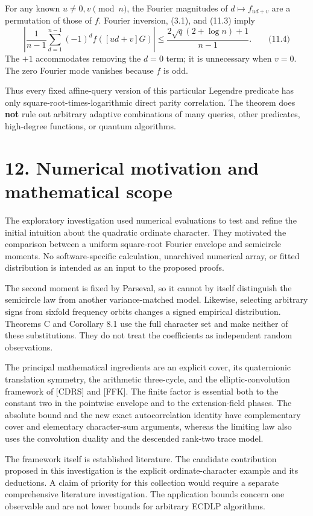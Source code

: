 \documentclass[
  11pt,
  a4paper,
]{article}
\begin{document}
For any known \(u\ne0,v\pmod n\), the Fourier magnitudes of
\(d\mapsto f_{ud+v}\) are a permutation of those of \(f\). Fourier
inversion, (3.1), and (11.3) imply \[
\boxed{
\left|\frac1{n-1}\sum_{d=1}^{n-1}(-1)^d f([ud+v]G)\right|
\le\frac{2\sqrt q(2+\log n)+1}{n-1}.
}
\qquad \text{(11.4)}
\] The \(+1\) accommodates removing the \(d=0\) term; it is unnecessary
when \(v=0\). The zero Fourier mode vanishes because \(f\) is odd.

Thus every fixed affine-query version of this particular Legendre
predicate has only square-root-times-logarithmic direct parity
correlation. The theorem does \textbf{not} rule out arbitrary adaptive
combinations of many queries, other predicates, high-degree functions,
or quantum algorithms.

\section{12. Numerical motivation and mathematical
scope}\label{numerical-motivation-and-mathematical-scope}

The exploratory investigation used numerical evaluations to test and
refine the initial intuition about the quadratic ordinate character.
They motivated the comparison between a uniform square-root Fourier
envelope and semicircle moments. No software-specific calculation,
unarchived numerical array, or fitted distribution is intended as an
input to the proposed proofs.

The second moment is fixed by Parseval, so it cannot by itself
distinguish the semicircle law from another variance-matched model.
Likewise, selecting arbitrary signs from sixfold frequency orbits
changes a signed empirical distribution. Theorems C and Corollary 8.1
use the full character set and make neither of these substitutions. They
do not treat the coefficients as independent random observations.

The principal mathematical ingredients are an explicit cover, its
quaternionic translation symmetry, the arithmetic three-cycle, and the
elliptic-convolution framework of {[}CDRS{]} and {[}FFK{]}. The finite
factor is essential both to the constant two in the pointwise envelope
and to the extension-field phases. The absolute bound and the new exact autocorrelation identity have
complementary cover and elementary character-sum arguments, whereas the
limiting law also uses the convolution duality and the descended
rank-two trace model.

The framework itself is established literature. The candidate
contribution proposed in this investigation is the explicit
ordinate-character example and its deductions. A claim of priority for
this collection would require a separate comprehensive literature
investigation. The application bounds concern one observable and are not
lower bounds for arbitrary ECDLP algorithms.
\end{document}

